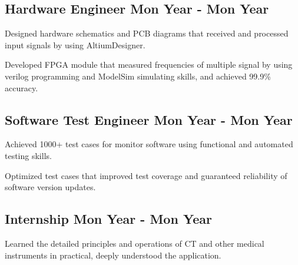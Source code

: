 \documentclass[a4paper,12pt]{article}
\begin{document}


\vspace*{10pt}
\subsection{{Hardware Engineer }\hfill Mon Year - Mon Year}
\begin{zitemize}
\item Designed hardware schematics and PCB diagrams that received and processed input signals by using AltiumDesigner. 
\item Developed FPGA module that measured frequencies of multiple signal by using verilog programming and ModelSim simulating skills, and achieved 99.9\% accuracy.
\end{zitemize}

\vspace*{6pt}
\subsection{{Software Test Engineer }\hfill Mon Year - Mon Year}
\begin{zitemize}
\item Achieved 1000+ test cases for monitor software using functional and automated testing skills. 
\item Optimized test cases that improved test coverage and guaranteed reliability of software version updates. 
\end{zitemize}

\vspace*{6pt}
\subsection{{Internship }\hfill Mon Year - Mon Year}
\begin{zitemize}
\item Learned the detailed principles and operations of CT and other medical instruments in practical, deeply understood the application.
\end{zitemize}
\end{document}
